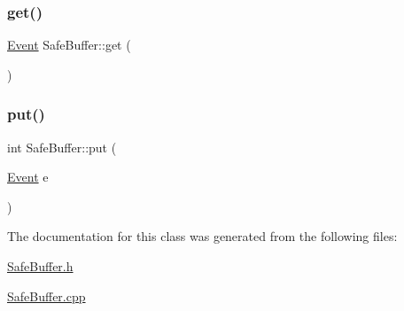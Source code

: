 \subsubsection{\texorpdfstring{get()}{get()}}
{\footnotesize\ttfamily \hyperlink{class_event}{Event} Safe\+Buffer\+::get (\begin{DoxyParamCaption}{ }\end{DoxyParamCaption})}

\mbox{\label{class_safe_buffer_a851df5cf7679efec7e27ec99842b7177}} 
\subsubsection{\texorpdfstring{put()}{put()}}
{\footnotesize\ttfamily int Safe\+Buffer\+::put (\begin{DoxyParamCaption}\item[{\hyperlink{class_event}{Event}}]{e }\end{DoxyParamCaption})}



The documentation for this class was generated from the following files\+:\begin{DoxyCompactItemize}
\item 
\hyperlink{_safe_buffer_8h}{Safe\+Buffer.\+h}\item 
\hyperlink{_safe_buffer_8cpp}{Safe\+Buffer.\+cpp}\end{DoxyCompactItemize}
